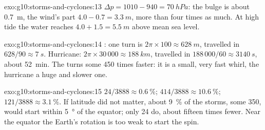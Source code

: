 \begin{solution}{exo:g10:storms-and-cyclones:13}
$\Delta p = 1010 - 940 = \qty{70}{hPa}$: the bulge is about \qty{0.7}{m}, the
wind's part $4.0 - 0.7 = \qty{3.3}{m}$, more than four times as much. At high
tide the water reaches $4.0 + 1.5 = \qty{5.5}{m}$ above mean sea level.
\end{solution}

\begin{solution}{exo:g10:storms-and-cyclones:14}
: one turn is $2\pi \times 100 \approx \qty{628}{m}$, travelled in
$628/90 \approx \qty{7}{s}$. Hurricane: $2\pi \times 30\,000 \approx
\qty{188}{km}$, travelled in $188\,000/60 \approx \qty{3140}{s}$, about
\qty{52}{min}. The  turns some 450 times faster: it is a small, very
fast whirl, the hurricane a huge and slower one.
\end{solution}

\begin{solution}{exo:g10:storms-and-cyclones:15}
$24/3888 \approx \qty{0.6}{\percent}$; $414/3888 \approx
\qty{10.6}{\percent}$; $121/3888 \approx \qty{3.1}{\percent}$. If latitude
did not matter, about \qty{9}{\percent} of the storms, some 350, would start
within \qty{5}{\degree} of the equator; only 24 do, about fifteen times
fewer. Near the equator the Earth's rotation is too weak to start the spin.
\end{solution}

